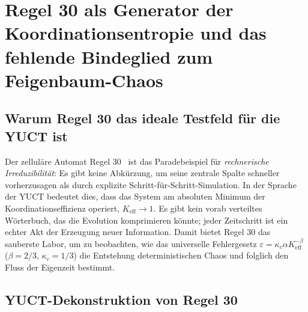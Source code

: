 \documentclass[12pt,a4paper]{article}
\newcommand{\Keff}{K_{\mathrm{eff}}}
\begin{document}
	\section{Regel 30 als Generator der Koordinationsentropie und das fehlende Bindeglied zum Feigenbaum-Chaos}
	\label{sec:rule30}
	
	\subsection{Warum Regel 30 das ideale Testfeld für die YUCT ist}
	Der zelluläre Automat Regel 30~\cite{Wolfram2002} ist das Paradebeispiel für \textit{rechnerische Irreduzibilität}: Es gibt keine Abkürzung, um seine zentrale Spalte schneller vorherzusagen als durch explizite Schritt-für-Schritt-Simulation. In der Sprache der YUCT bedeutet dies, dass das System am absoluten Minimum der Koordinationseffizienz operiert, \(\Keff \to 1\). Es gibt kein vorab verteiltes Wörterbuch, das die Evolution komprimieren könnte; jeder Zeitschritt ist ein echter Akt der Erzeugung neuer Information. Damit bietet Regel 30 das sauberste Labor, um zu beobachten, wie das universelle Fehlergesetz \(\varepsilon = \kappa_c \alpha \Keff^{-\beta}\) (\(\beta=2/3\), \(\kappa_c=1/3\)) die Entstehung deterministischen Chaos und folglich den Fluss der Eigenzeit bestimmt.
	
	\subsection{YUCT-Dekonstruktion von Regel 30}
	\label{subsec:deconstruction}
	
\end{document}
